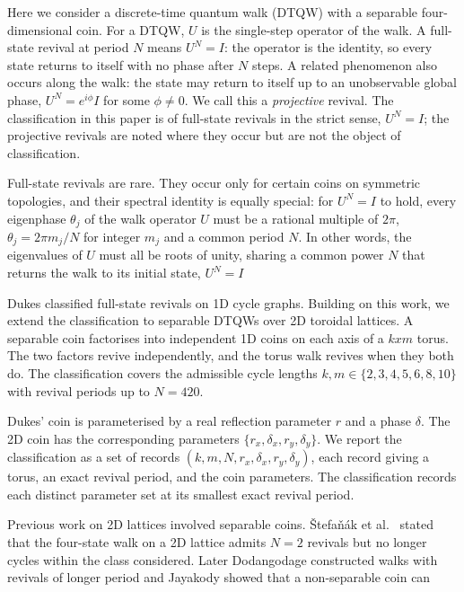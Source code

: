 \documentclass[aps,pra,reprint,amsmath,amssymb,superscriptaddress,floatfix]{revtex4-2}
\def\times{x}%
\def\rho{r}%
\begin{document}
Here we consider a discrete-time quantum walk (DTQW) with a separable
four-dimensional coin. For a DTQW, $U$ is the single-step operator of
the walk. A full-state revival at period $N$ means $U^N = I$: the
operator is the identity, so every state returns to itself with no
phase after $N$ steps. A related phenomenon also occurs along the
walk: the state may return to itself up to an unobservable global
phase, $U^N = e^{i\phi} I$ for some $\phi \neq 0$. We call this a
\emph{projective} revival. The classification in this paper is of
full-state revivals in the strict sense, $U^N = I$; the projective
revivals are noted where they occur but are not the object of
classification.
\par
Full-state revivals are rare. They occur only for certain coins on
symmetric topologies, and their spectral identity is equally special:
for $U^N = I$ to hold, every eigenphase $\theta_j$ of the walk operator
$U$ must be a rational multiple of $2\pi$, $\theta_j = 2\pi m_j / N$
for integer $m_j$ and a common period $N$. In other words, the
eigenvalues of $U$ must all be roots of unity, sharing a common power
$N$ that returns the walk to its initial state, $U^N = I$
\par
Dukes \cite{Dukes2014} classified full-state revivals on 1D cycle
graphs. Building on this work, we extend the classification to
separable DTQWs over 2D toroidal lattices. A
separable coin factorises into independent 1D coins on each axis of a
$k \times m$ torus. The two factors revive independently, and the
torus walk revives when they both do. The classification covers the admissible 
cycle lengths $k, m \in \{2, 3, 4, 5, 6, 8, 10\}$ with revival periods up
to $N = 420$.
\par
Dukes' coin is parameterised by a real reflection parameter $\rho$
and a phase $\delta$. The 2D coin has the corresponding
parameters $\{\rho_x, \delta_x, \rho_y, \delta_y\}$. We report the
classification as a set of records
$(k, m, N, \rho_x, \delta_x, \rho_y, \delta_y)$, each record giving a
torus, an exact revival period, and the coin parameters. The 
classification records each distinct parameter set at its smallest
exact revival period.
\par
Previous work on 2D lattices involved separable coins.   \v{S}tefa\v{n}\'ak et al.\
\cite{Stefanak2010} stated that the four-state walk
on a 2D lattice admits $N = 2$ revivals but no
longer cycles within the class considered.
Later Dodangodage \cite{Dodangodage2018} constructed walks with
revivals of longer period and Jayakody \cite{Jayakody2018} showed that a non-separable coin can
\end{document}

